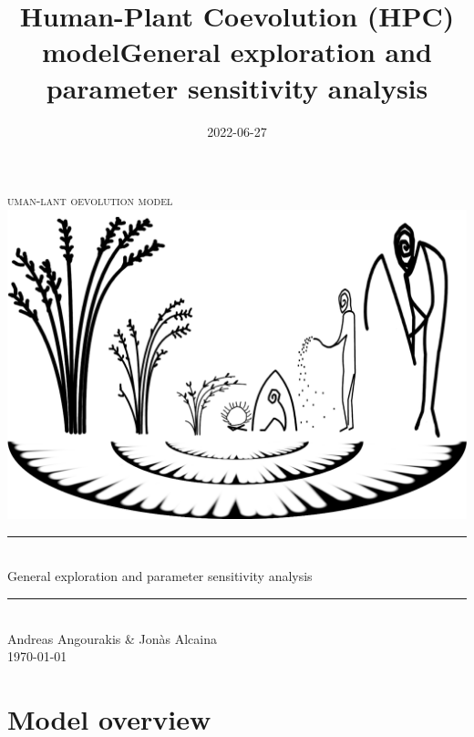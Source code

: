 \documentclass[
]{book}
\title{Human-Plant Coevolution (HPC) modelGeneral exploration and parameter sensitivity analysis}
\author{}
\date{\vspace{-2.5em}2022-06-27}
\begin{document}
\maketitle

\newcommand{\HRule}{\rule{\linewidth}{0.5mm}}


\begin{center}

\textsc{\LARGE
{}uman-lant oevolution model} 
\\[1cm]
\includegraphics[width=\textwidth]{images/hpcModel-logo_v2.png}
\\[1.5cm]
\HRule \\[0.4cm]
{ \huge General exploration and parameter sensitivity analysis \\[0.15cm] }
\HRule \\[1.5cm]
Andreas Angourakis \& Jon\`{a}s Alcaina
\\[1cm]
\today \\ [1cm]

\end{center}

\newpage
{}

{
\hypersetup{linkcolor=}
\setcounter{tocdepth}{1}
\tableofcontents
}
\hypertarget{model-overview}{%
\chapter*{Model overview}\label{model-overview}}
\end{document}
